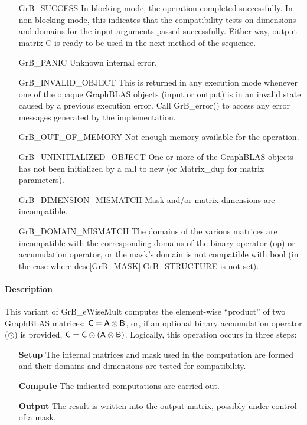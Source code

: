 \begin{itemize}[leftmargin=2.1in]
    \item[{\sf GrB\_SUCCESS}]         In blocking mode, the operation completed
    successfully. In non-blocking mode, this indicates that the compatibility 
    tests on dimensions and domains for the input arguments passed successfully. 
    Either way, output matrix {\sf C} is ready to be used in the next method of
    the sequence.

    \item[{\sf GrB\_PANIC}]           Unknown internal error.

    \item[{\sf GrB\_INVALID\_OBJECT}] This is returned in any execution mode 
    whenever one of the opaque GraphBLAS objects (input or output) is in an invalid 
    state caused by a previous execution error.  Call {\sf GrB\_error()} to access 
    any error messages generated by the implementation.

    \item[{\sf GrB\_OUT\_OF\_MEMORY}] Not enough memory available for the operation.

    \item[{\sf GrB\_UNINITIALIZED\_OBJECT}] One or more of the GraphBLAS objects 
    has not been initialized by a call to {\sf new} (or {\sf Matrix\_dup} for matrix
    parameters).

    \item[{\sf GrB\_DIMENSION\_MISMATCH}] Mask and/or matrix
    dimensions are incompatible.

    \item[{\sf GrB\_DOMAIN\_MISMATCH}]    The domains of the various matrices are
    incompatible with the corresponding domains of the binary operator ({\sf op}) or
    accumulation operator, or the mask's domain is not compatible with {\sf bool}
    (in the case where {\sf desc[GrB\_MASK].GrB\_STRUCTURE} is not set).
\end{itemize}

\paragraph{Description}

This variant of {\sf GrB\_eWiseMult} computes the element-wise ``product'' of
two GraphBLAS matrices: ${\sf C} = {\sf A} \otimes {\sf B}$, or, if an optional
binary accumulation operator ($\odot$) is provided, ${\sf C} = {\sf C} \odot
\left({\sf A} \otimes {\sf B}\right)$.  Logically, this operation occurs in
three steps:
\begin{enumerate}[leftmargin=0.85in]
\item[\bf Setup] The internal matrices and mask used in the computation are formed and their 
domains and dimensions are tested for compatibility.
\item[\bf Compute] The indicated computations are carried out.
\item[\bf Output] The result is written into the output matrix, possibly under control of a mask.
\end{enumerate}

